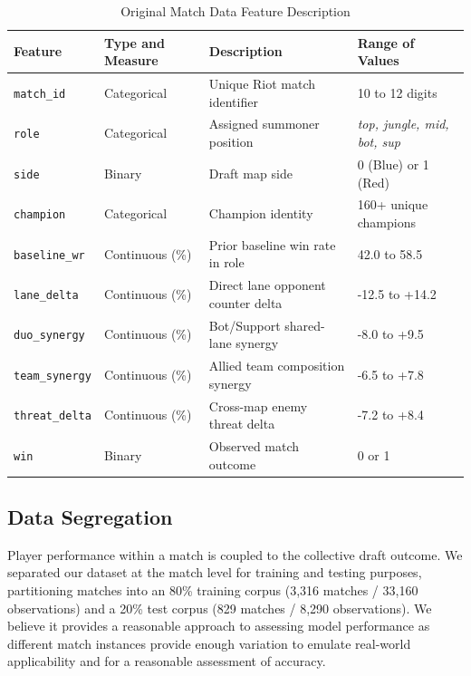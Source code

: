 \documentclass[11pt,letterpaper]{article}
\begin{document}
\vspace{-0.5em}
\begin{table}[h]
\centering
\caption{Original Match Data Feature Description}
\label{tab:features}
\footnotesize
\begin{tabular}{p{2.4cm}p{2.6cm}p{6.4cm}p{3.4cm}}
\toprule
\textbf{Feature} & \textbf{Type and Measure} & \textbf{Description} & \textbf{Range of Values} \\
\midrule
\texttt{match\_id} & Categorical & Unique Riot match identifier & 10 to 12 digits \\
\texttt{role} & Categorical & Assigned summoner position & \textit{top, jungle, mid, bot, sup} \\
\texttt{side} & Binary & Draft map side & 0 (Blue) or 1 (Red) \\
\texttt{champion} & Categorical & Champion identity & 160+ unique champions \\
\texttt{baseline\_wr} & Continuous (\%) & Prior baseline win rate in role & 42.0 to 58.5 \\
\texttt{lane\_delta} & Continuous (\%) & Direct lane opponent counter delta & -12.5 to +14.2 \\
\texttt{duo\_synergy} & Continuous (\%) & Bot/Support shared-lane synergy & -8.0 to +9.5 \\
\texttt{team\_synergy} & Continuous (\%) & Allied team composition synergy & -6.5 to +7.8 \\
\texttt{threat\_delta} & Continuous (\%) & Cross-map enemy threat delta & -7.2 to +8.4 \\
\texttt{win} & Binary & Observed match outcome & 0 or 1 \\
\bottomrule
\end{tabular}
\end{table}
\vspace{-0.7em}

\subsection{Data Segregation}

Player performance within a match is coupled to the collective draft outcome. We separated our dataset at the match level for training and testing purposes, partitioning matches into an 80\% training corpus (3,316 matches / 33,160 observations) and a 20\% test corpus (829 matches / 8,290 observations). We believe it provides a reasonable approach to assessing model performance as different match instances provide enough variation to emulate real-world applicability and for a reasonable assessment of accuracy.
\end{document}
